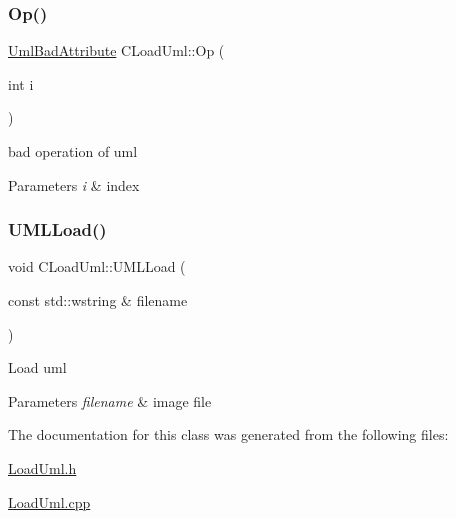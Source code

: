 \subsubsection{\texorpdfstring{Op()}{Op()}}
{\footnotesize\ttfamily \mbox{\hyperlink{class_uml_bad_attribute}{Uml\+Bad\+Attribute}} C\+Load\+Uml\+::\+Op (\begin{DoxyParamCaption}\item[{int}]{i }\end{DoxyParamCaption})}

bad operation of uml 
\begin{DoxyParams}{Parameters}
{\em i} & index \\
\hline
\end{DoxyParams}
\mbox{\label{class_c_load_uml_a176855f9408cda77d900529b144e4a28}} 
\subsubsection{\texorpdfstring{UMLLoad()}{UMLLoad()}}
{\footnotesize\ttfamily void C\+Load\+Uml\+::\+U\+M\+L\+Load (\begin{DoxyParamCaption}\item[{const std\+::wstring \&}]{filename }\end{DoxyParamCaption})}

Load uml 
\begin{DoxyParams}{Parameters}
{\em filename} & image file \\
\hline
\end{DoxyParams}


The documentation for this class was generated from the following files\+:\begin{DoxyCompactItemize}
\item 
\mbox{\hyperlink{_load_uml_8h}{Load\+Uml.\+h}}\item 
\mbox{\hyperlink{_load_uml_8cpp}{Load\+Uml.\+cpp}}\end{DoxyCompactItemize}
